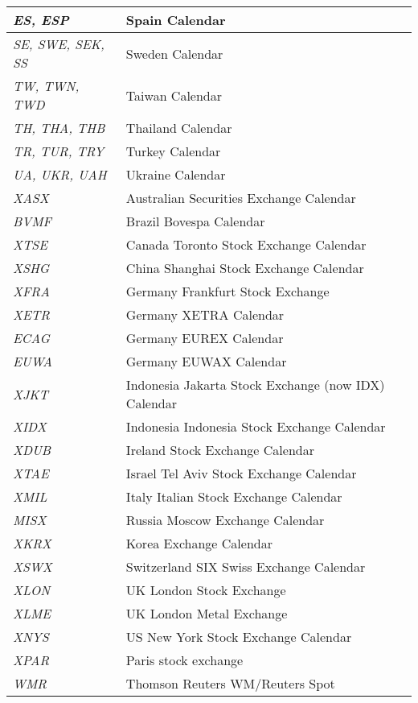 \begin{longtable}{| p{} | p{} |}
    \emph{ES, ESP} & Spain Calendar \\ \hline
    \emph{SE, SWE, SEK, SS} & Sweden Calendar \\ \hline        
    \emph{TW, TWN, TWD} & Taiwan Calendar \\ \hline
    \emph{TH, THA, THB} & Thailand Calendar \\ \hline
    \emph{TR, TUR, TRY} & Turkey Calendar \\ \hline
    \emph{UA, UKR, UAH} & Ukraine Calendar \\ \hline
    \emph{XASX} & Australian Securities Exchange Calendar \\ \hline
    \emph{BVMF} & Brazil Bovespa Calendar \\ \hline
    \emph{XTSE} & Canada Toronto Stock Exchange Calendar \\ \hline
    \emph{XSHG} & China Shanghai Stock Exchange Calendar \\ \hline
    \emph{XFRA} & Germany Frankfurt Stock Exchange \\ \hline
    \emph{XETR} & Germany XETRA Calendar \\ \hline
    \emph{ECAG} & Germany EUREX Calendar \\ \hline
    \emph{EUWA} & Germany EUWAX Calendar \\ \hline
    \emph{XJKT} & Indonesia Jakarta Stock Exchange (now IDX) Calendar \\ \hline
    \emph{XIDX} & Indonesia Indonesia Stock Exchange Calendar \\ \hline
    \emph{XDUB} & Ireland Stock Exchange Calendar \\ \hline
    \emph{XTAE} & Israel Tel Aviv Stock Exchange Calendar \\ \hline
    \emph{XMIL} & Italy Italian Stock Exchange Calendar \\ \hline
    \emph{MISX} & Russia Moscow Exchange Calendar \\ \hline
    \emph{XKRX} & Korea Exchange Calendar \\ \hline
    \emph{XSWX} & Switzerland SIX Swiss Exchange Calendar \\ \hline
    \emph{XLON} & UK London Stock Exchange \\ \hline
    \emph{XLME} & UK London Metal Exchange \\ \hline
    \emph{XNYS} & US New York Stock Exchange Calendar \\ \hline
    \emph{XPAR} & Paris stock exchange \\ \hline
    \emph{WMR} & Thomson Reuters WM/Reuters Spot \\ \hline

\end{longtable}
